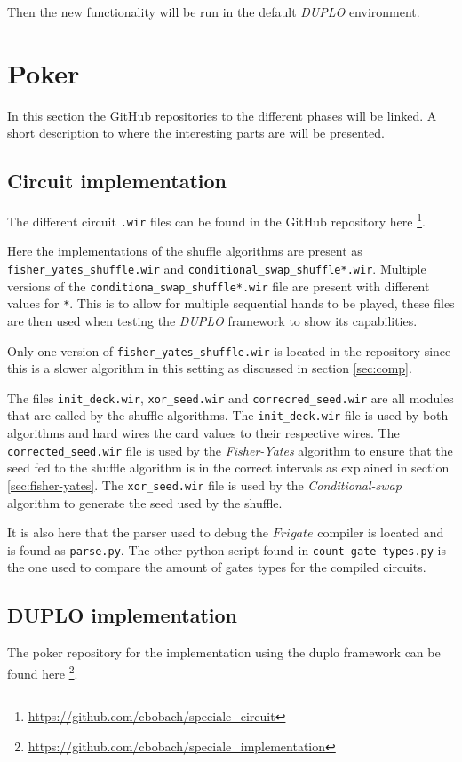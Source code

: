 \documentclass[twoside,11pt,openright]{report}
\newcommand{\FY}{\textit{Fisher-Yates} }
\newcommand{\CS}{\textit{Conditional-swap} }
\newcommand{\DUPLO}{\textit{DUPLO} }
\begin{document}
\begin{appendices}
Then the new functionality will be run in the default \DUPLO environment.

\section{Poker}
\label{app:poker}
In this section the GitHub repositories to the different phases will be linked. A short description to where the interesting parts are will be presented.

\subsection{Circuit implementation}
\label{app:circuit-impl}
The different circuit \verb|.wir| files can be found in the GitHub repository here \footnote{\url{https://github.com/cbobach/speciale_circuit}}.

Here the implementations of the shuffle algorithms are present as \verb|fisher_yates_shuffle.wir| and \verb|conditional_swap_shuffle*.wir|. Multiple versions of the \verb|conditiona_swap_shuffle*.wir| file are present with different values for \verb|*|. This is to allow for multiple sequential hands to be played, these files are then used when testing the \DUPLO framework to show its capabilities.

Only one version of \verb|fisher_yates_shuffle.wir| is located in the repository since this is a slower algorithm in this setting as discussed in section \ref{sec:comp}.

The files \verb|init_deck.wir|, \verb|xor_seed.wir| and \verb|correcred_seed.wir| are all modules that are called by the shuffle algorithms. The \verb|init_deck.wir| file is used by both algorithms and hard wires the card values to their respective wires. The \verb|corrected_seed.wir| file is used by the \FY algorithm to ensure that the seed fed to the shuffle algorithm is in the correct intervals as explained in section \ref{sec:fisher-yates}. The \verb|xor_seed.wir| file is used by the \CS algorithm to generate the seed used by the shuffle.

\bigskip

It is also here that the parser used to debug the $Frigate$ compiler is located and is found as \verb|parse.py|. The other python script found in \verb|count-gate-types.py| is the one used to compare the amount of gates types for the compiled circuits.


\subsection{DUPLO implementation}
\label{app:duplo-impl}
The poker repository for the implementation using the duplo framework can be found here \footnote{\url{https://github.com/cbobach/speciale_implementation}}.


\end{appendices}
\end{document}
